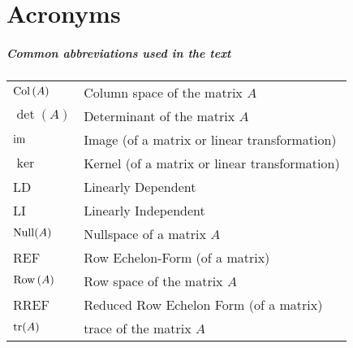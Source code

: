%
%

\chapter*{Acronyms}
  

\paragraph{Common abbreviations used in the text}


\begin{tabular}{ll}
$\operatorname{Col\,}(A)$ &{Column space of the matrix $A$}\\
$\det(A)$ &  {Determinant of the matrix $A$}\\
$\operatorname{im}\,$ & {Image (of a matrix or linear transformation)}\\
$\ker$ &  {Kernel (of a matrix or linear transformation)}\\
LD & {Linearly Dependent}\\
LI & {Linearly Independent}\\
$\operatorname{Null}(A)$ & {Nullspace of a matrix $A$} \\
REF & {Row Echelon-Form (of a matrix)}\\
$\operatorname{Row\,}(A)$ & {Row space of the matrix $A$}\\
RREF & {Reduced Row Echelon Form (of a matrix)}\\
$\operatorname{tr}(A)$ & {trace of the matrix $A$}
\end{tabular}


